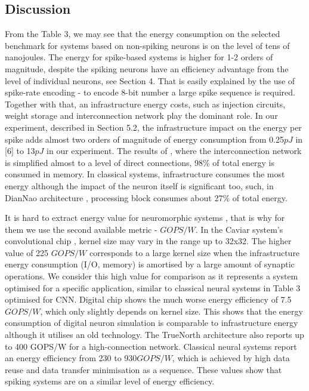 \documentclass[conference, compsoc]{IEEEtran}
\begin{document}
\subsection{Discussion}
From the Table 3, we may see that the energy consumption on the selected benchmark for systems based on non-spiking neurons is on the level of tens of nanojoules. The energy for spike-based systems is higher for 1-2 orders of magnitude, despite the spiking neurons have an efficiency advantage from the level of individual neurons, see Section 4. That is easily explained by the use of spike-rate encoding - to encode 8-bit number a large spike sequence is required. Together with that, an infrastructure energy costs, such as injection circuits, weight storage and interconnection network play the dominant role. In our experiment, described in Section 5.2, the infrastructure impact on the energy per spike adds almost two orders of magnitude of energy consumption from 0.25$ pJ $ in [6] to 13$ pJ $ in our experiment. The results of \cite{12p}, where the interconnection network is simplified almost to a level of direct connections, 98\% of total energy is consumed in memory. In classical systems, infrastructure consumes the most energy although the impact of the neuron itself is significant too, such, in DianNao architecture \cite{DianNao}, processing block consumes about 27\% of total energy.

It is hard to extract energy value for neuromorphic systems \cite{DVS_analog,CAVIAR,DVS_digital}, that is why for them we use the second available metric - $ GOPS/W $. In the Caviar system’s convolutional chip \cite{DVS_analog,CAVIAR}, kernel size may vary in the range up to 32x32. The higher value of 225 $ GOPS/W $ corresponds to a large kernel size when the infrastructure energy consumption (I/O, memory) is amortised by a large amount of synaptic operations. We consider this high value for comparison as it represents a system optimised for a specific application, similar to classical neural systems in Table 3 optimised for CNN. Digital chip \cite{DVS_digital} shows the much worse energy efficiency of 7.5$ GOPS/W $, which only slightly depends on kernel size. This shows that the energy consumption of digital neuron simulation is comparable to infrastructure energy although it utilises an old technology. The TrueNorth architecture \cite{TrueNorth} also reports up to 400 GOPS/W for a high-connection network. Classical neural systems report an energy efficiency from 230 to 930$ GOPS/W $, which is achieved by high data reuse and data transfer minimisation as a sequence. These values show that spiking systems are on a similar level of energy efficiency.
\end{document}
